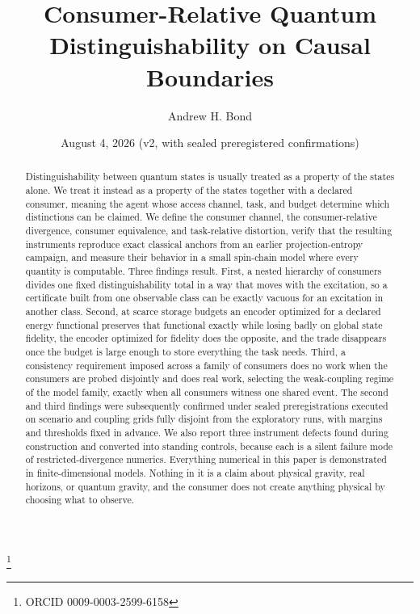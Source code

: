 \documentclass[aps,prd,reprint,nofootinbib,longbibliography]{revtex4-2}
\begin{document}
\title{Consumer-Relative Quantum Distinguishability on Causal Boundaries}

\author{Andrew H. Bond}
\thanks{ORCID 0009-0003-2599-6158}
\date{August 4, 2026 (v2, with sealed preregistered confirmations)}

\begin{abstract}
Distinguishability between quantum states is usually treated as a property of
the states alone.  We treat it instead as a property of the states together
with a declared consumer, meaning the agent whose access channel, task, and
budget determine which distinctions can be claimed.  We define the consumer
channel, the consumer-relative divergence, consumer equivalence, and
task-relative distortion, verify that the resulting instruments reproduce
exact classical anchors from an earlier projection-entropy campaign, and
measure their behavior in a small spin-chain model where every quantity is
computable.  Three findings result.  First, a nested hierarchy of consumers
divides one fixed distinguishability total in a way that moves with the
excitation, so a certificate built from one observable class can be exactly
vacuous for an excitation in another class.  Second, at scarce storage
budgets an encoder optimized for a declared energy functional preserves that
functional exactly while losing badly on global state fidelity, the encoder
optimized for fidelity does the opposite, and the trade disappears once the
budget is large enough to store everything the task needs.  Third, a
consistency requirement imposed across a family of consumers does no work
when the consumers are probed disjointly and does real work, selecting the
weak-coupling regime of the model family, exactly when all consumers witness
one shared event.  The second and third findings were subsequently
confirmed under sealed preregistrations executed on scenario and coupling
grids fully disjoint from the exploratory runs, with margins and
thresholds fixed in advance.  We also report three instrument defects found during
construction and converted into standing controls, because each is a silent
failure mode of restricted-divergence numerics.  Everything numerical in
this paper is demonstrated in finite-dimensional models.  Nothing in it is a
claim about physical gravity, real horizons, or quantum gravity, and the
consumer does not create anything physical by choosing what to observe.
\end{abstract}
\end{document}
